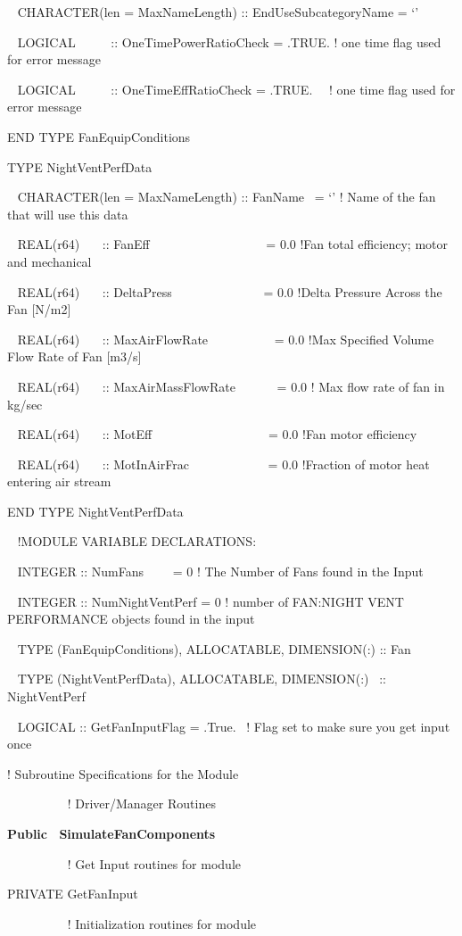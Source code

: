 ~ CHARACTER(len = MaxNameLength) :: EndUseSubcategoryName = `'

~ LOGICAL~~~~~ :: OneTimePowerRatioCheck = .TRUE. ! one time flag used for error message

~ LOGICAL~~~~~ :: OneTimeEffRatioCheck = .TRUE.~~ ! one time flag used for error message

END TYPE FanEquipConditions

TYPE NightVentPerfData

~ CHARACTER(len = MaxNameLength) :: FanName~ = `' ! Name of the fan that will use this data

~ REAL(r64)~~~ :: FanEff~~~~~~~~~~~~~~~~~~ = 0.0 !Fan total efficiency; motor and mechanical

~ REAL(r64)~~~ :: DeltaPress~~~~~~~~~~~~~~ = 0.0 !Delta Pressure Across the Fan {[}N/m2{]}

~ REAL(r64)~~~ :: MaxAirFlowRate~~~~~~~~~~ = 0.0 !Max Specified Volume Flow Rate of Fan {[}m3/s{]}

~ REAL(r64)~~~ :: MaxAirMassFlowRate~~~~~~ = 0.0 ! Max flow rate of fan in kg/sec

~ REAL(r64)~~~ :: MotEff~~~~~~~~~~~~~~~~~~ = 0.0 !Fan motor efficiency

~ REAL(r64)~~~ :: MotInAirFrac~~~~~~~~~~~~ = 0.0 !Fraction of motor heat entering air stream

END TYPE NightVentPerfData

~ !MODULE VARIABLE DECLARATIONS:

~ INTEGER :: NumFans~~~~ = 0 ! The Number of Fans found in the Input

~ INTEGER :: NumNightVentPerf = 0 ! number of FAN:NIGHT VENT PERFORMANCE objects found in the input

~ TYPE (FanEquipConditions), ALLOCATABLE, DIMENSION(:) :: Fan

~ TYPE (NightVentPerfData), ALLOCATABLE, DIMENSION(:)~ :: NightVentPerf

~ LOGICAL :: GetFanInputFlag = .True.~ ! Flag set to make sure you get input once

! Subroutine Specifications for the Module

~~~~~~~~~ ! Driver/Manager Routines

\textbf{Public~ SimulateFanComponents}

~~~~~~~~~ ! Get Input routines for module

PRIVATE GetFanInput

~~~~~~~~~ ! Initialization routines for module

